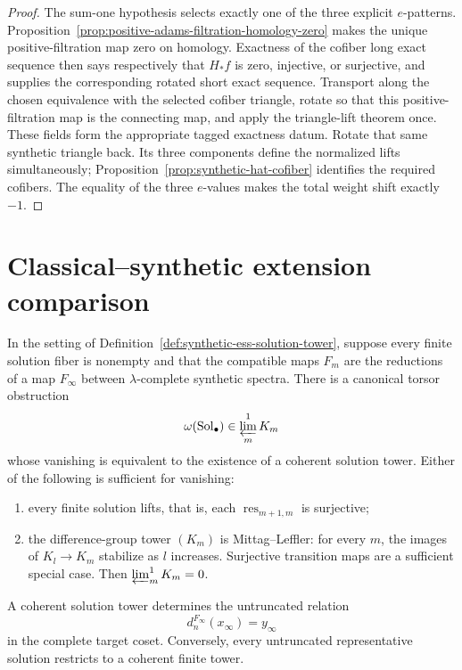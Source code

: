 \begin{proof}
  The sum-one hypothesis selects exactly one of the three explicit
  $e$-patterns.  Proposition~\ref{prop:positive-adams-filtration-homology-zero}
  makes the unique positive-filtration map zero on homology.  Exactness of the
  cofiber long exact sequence then says respectively that $H_*f$ is zero,
  injective, or surjective, and supplies the corresponding rotated short exact
  sequence.  Transport along the chosen equivalence with the selected cofiber
  triangle, rotate so that this positive-filtration map is the connecting map,
  and apply the triangle-lift theorem once.  These fields form the appropriate
  tagged exactness datum.  Rotate that same synthetic triangle back.  Its three components define the normalized lifts
  simultaneously; Proposition~\ref{prop:synthetic-hat-cofiber} identifies the
  required cofibers.  The equality of the three $e$-values makes the total
  weight shift exactly $-1$.
\end{proof}

\section{Classical--synthetic extension comparison}

\begin{lemma}
  \label{lem:synthetic-ess-coherent-tower-limit}
  \notready
  In the setting of
  Definition~\ref{def:synthetic-ess-solution-tower}, suppose every finite
  solution fiber is nonempty and that the compatible maps $F_m$ are the
  reductions of a map $F_\infty$ between $\lambda$-complete synthetic spectra.
  There is a canonical torsor obstruction
  \[
    \omega(\operatorname{Sol}_\bullet)
      \in \varprojlim^{1}_{m} K_m
  \]
  whose vanishing is equivalent to the existence of a coherent solution
  tower.  Either of the following is sufficient for vanishing:
  \begin{enumerate}
    \item every finite solution lifts, that is, each
      $\operatorname{res}_{m+1,m}$ is surjective;
    \item the difference-group tower $(K_m)$ is Mittag--Leffler: for every
      $m$, the images of $K_l\to K_m$ stabilize as $l$ increases.  Surjective
      transition maps are a sufficient special case.  Then
      $\varprojlim^1_m K_m=0$.
  \end{enumerate}
  A coherent solution tower determines the untruncated relation
  \[
    d_n^{F_\infty}(x_\infty)=y_\infty
  \]
  in the complete target coset.  Conversely, every untruncated representative
  solution restricts to a coherent finite tower.
\end{lemma}

